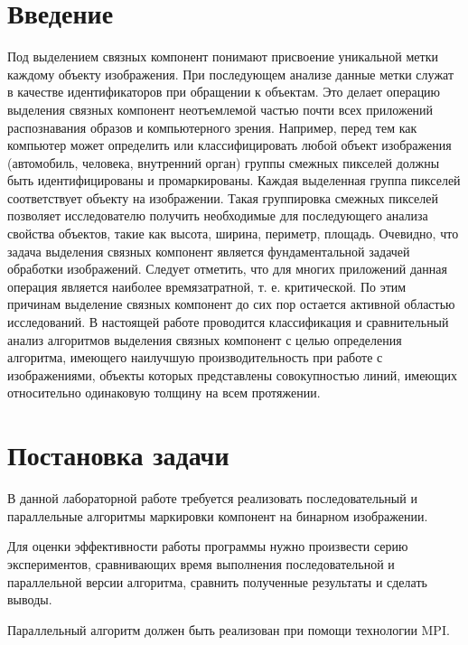 \documentclass{report}
\begin{document}
\setcounter{page}{2}

\tableofcontents
\newpage

\section*{Введение}
\par Под выделением связных компонент понимают присвоение
уникальной метки каждому объекту изображения. При
последующем анализе данные метки служат в качестве
идентификаторов при обращении к объектам. Это делает
операцию выделения связных компонент неотъемлемой
частью почти всех приложений распознавания образов и
компьютерного зрения. Например, перед тем как компьютер
может определить или классифицировать любой объект
изображения (автомобиль, человека, внутренний орган)
группы смежных пикселей должны быть идентифицированы
и промаркированы. Каждая выделенная группа пикселей
соответствует объекту на изображении. Такая группировка
смежных пикселей позволяет исследователю получить
необходимые для последующего анализа свойства объектов,
такие как высота, ширина, периметр, площадь. Очевидно, что
задача выделения связных компонент является
фундаментальной задачей обработки изображений. Следует
отметить, что для многих приложений данная операция
является наиболее времязатратной, т. е. критической. По этим
причинам выделение связных компонент до сих пор остается
активной областью исследований. В
настоящей работе проводится классификация и
сравнительный анализ алгоритмов выделения связных
компонент с целью определения алгоритма, имеющего
наилучшую производительность при работе с
изображениями, объекты которых представлены
совокупностью линий, имеющих относительно одинаковую
толщину на всем протяжении. 

\newpage

\section*{Постановка задачи}
\par В данной лабораторной работе требуется реализовать последовательный и параллельные алгоритмы маркировки компонент на бинарном изображении.
\par Для оценки эффективности работы программы нужно произвести серию экспериментов, сравнивающих время выполнения последовательной и параллельной версии алгоритма, сравнить полученные результаты и сделать выводы.
\par Параллельный алгоритм должен быть реализован при помощи технологии MPI.
\newpage
\end{document}
